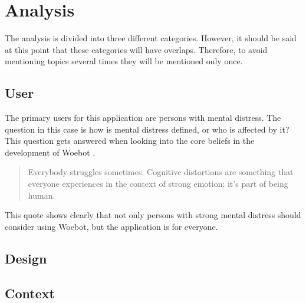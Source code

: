 \section{Analysis}\label{sec:analysis}
The analysis is divided into three different categories.
However, it should be said at this point that these categories will have overlaps.
Therefore, to avoid mentioning topics several times they will be mentioned only once.

\subsection{User}
The primary users for this application are persons with mental distress.
The question in this case is how is mental distress defined, or who is affected by it?
This question gets answered when looking into the core beliefs in the development of Woebot \cite{woebot-beliefs}.

\begin{quote}
    Everybody struggles sometimes. Cognitive distortions are something that everyone experiences in the context of strong emotion; it's part of being human.
\end{quote}

This quote shows clearly that not only persons with strong mental distress should consider using Woebot, but the application is for everyone.







\subsection{Design}


\subsection{Context}
